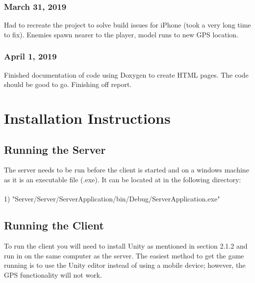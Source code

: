 \documentclass[a4paper]{report}
\begin{document}
\subsection{March 31, 2019}
Had to recreate the project to solve build issues for iPhone (took a very long time to fix). Enemies spawn nearer to the player, model runs to new GPS location.
\subsection{April 1, 2019}
Finished documentation of code using Doxygen to create HTML pages. The code should be good to go. Finishing off report.




\newpage
\appendix
\chapter{Installation Instructions}
\section{Running the Server}
The server needs to be run before the client is started and on a windows machine as it is an executable file (.exe). It can be located at in the following directory:
\\\\
1) "Server/Server/ServerApplication/bin/Debug/ServerApplication.exe"
\section{Running the Client}
To run the client you will need to install Unity as mentioned in section 2.1.2 and run in on the same computer as the server. The easiest method to get the game running is to use the Unity editor instead of using a mobile device; however, the GPS functionality will not work.
\end{document}
